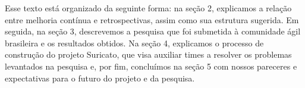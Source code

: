 Esse texto está organizado da seguinte forma: na seção 2, explicamos a relação entre melhoria contínua e retrospectivas, assim como sua estrutura sugerida. Em seguida, na seção 3, descrevemos a pesquisa que foi submetida à comunidade ágil brasileira e os resultados obtidos. Na seção 4, explicamos o processo de construção do projeto Suricato, que visa auxiliar times a resolver os problemas levantados na pesquisa e, por fim, concluímos na seção 5 com nossos pareceres e expectativas para o futuro do projeto e da pesquisa.